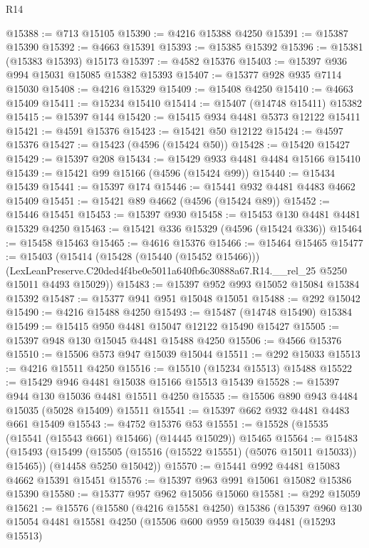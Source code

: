 \begin{lexlean}{R14}
\begin{coremodule}
@15388 := @713 @15105
@15390 := @4216 @15388 @4250
@15391 := @15387 @15390
@15392 := @4663 @15391
@15393 := @15385 @15392
@15396 := @15381 (@15383 @15393) @15173
@15397 := @4582 @15376
@15403 := @15397 @936 @994 @15031 @15085 @15382 @15393
@15407 := @15377 @928 @935 @7114 @15030
@15408 := @4216 @15329
@15409 := @15408 @4250
@15410 := @4663 @15409
@15411 := @15234 @15410
@15414 := @15407 (@14748 @15411) @15382
@15415 := @15397 @144
@15420 := @15415 @934 @4481 @5373 @12122 @15411
@15421 := @4591 @15376
@15423 := @15421 @50 @12122
@15424 := @4597 @15376
@15427 := @15423 (@4596 (@15424 @50))
@15428 := @15420 @15427
@15429 := @15397 @208
@15434 := @15429 @933 @4481 @4484 @15166 @15410
@15439 := @15421 @99 @15166 (@4596 (@15424 @99))
@15440 := @15434 @15439
@15441 := @15397 @174
@15446 := @15441 @932 @4481 @4483 @4662 @15409
@15451 := @15421 @89 @4662 (@4596 (@15424 @89))
@15452 := @15446 @15451
@15453 := @15397 @930
@15458 := @15453 @130 @4481 @4481 @15329 @4250
@15463 := @15421 @336 @15329 (@4596 (@15424 @336))
@15464 := @15458 @15463
@15465 := @4616 @15376
@15466 := @15464 @15465
@15477 := @15403
    (@15414
      (@15428 (@15440 (@15452 @15466)))
      (LexLeanPreserve.C20ded4f4be0e5011a640fb6c30888a67.R14.__rel_25 @5250 @15011 @4493 @15029))
@15483 := @15397 @952 @993 @15052 @15084 @15384 @15392
@15487 := @15377 @941 @951 @15048 @15051
@15488 := @292 @15042
@15490 := @4216 @15488 @4250
@15493 := @15487 (@14748 @15490) @15384
@15499 := @15415 @950 @4481 @15047 @12122 @15490 @15427
@15505 := @15397 @948 @130 @15045 @4481 @15488 @4250
@15506 := @4566 @15376
@15510 := @15506 @573 @947 @15039 @15044
@15511 := @292 @15033
@15513 := @4216 @15511 @4250
@15516 := @15510 (@15234 @15513) @15488
@15522 := @15429 @946 @4481 @15038 @15166 @15513 @15439
@15528 := @15397 @944 @130 @15036 @4481 @15511 @4250
@15535 := @15506 @890 @943 @4484 @15035 (@5028 @15409) @15511
@15541 := @15397 @662 @932 @4481 @4483 @661 @15409
@15543 := @4752 @15376 @53
@15551 := @15528 (@15535 (@15541 (@15543 @661) @15466) (@14445 @15029)) @15465
@15564 := @15483
    (@15493
      (@15499 (@15505 (@15516 (@15522 @15551) (@5076 @15011 @15033)) @15465))
      (@14458 @5250 @15042))
@15570 := @15441 @992 @4481 @15083 @4662 @15391 @15451
@15576 := @15397 @963 @991 @15061 @15082 @15386 @15390
@15580 := @15377 @957 @962 @15056 @15060
@15581 := @292 @15059
@15621 := @15576
    (@15580
      (@4216 @15581 @4250)
      @15386
      (@15397
        @960
        @130
        @15054
        @4481
        @15581
        @4250
        (@15506
          @600
          @959
          @15039
          @4481
          (@15293 @15513)

\end{coremodule}
\end{lexlean}
